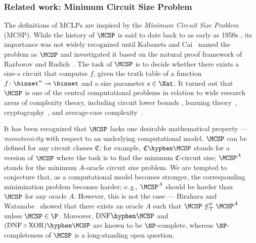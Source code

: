 \documentclass[11pt]{article}
\numberwithin{equation}{section}
\theoremstyle{definition}
\theoremstyle{plain}
\newcommand{\eg}{e.\,g.}
\begin{document}
\subsubsection{Related work: Minimum Circuit Size Problem}
The definitions of MCLPs  are inspired by
the \emph{Minimum Circuit Size Problem} (MCSP).
%
%
While the history of $\MCSP$ is said to date back to as early as 1950s \cite{Trakhtenbrot84_annals_journals},
its importance was not widely recognized
until
Kabanets and Cai~\cite{KabanetsC00_stoc_conf}
named the problem as $\MCSP$
and investigated it
based on the natural proof framework of Razborov and Rudich~\cite{RazborovR97_jcss_journals}.
The task of $\MCSP$
is
to decide whether there exists a size-$s$ circuit that computes $f$,
given the truth table of a function $f \colon \binset^n \to \binset$
and a size parameter $s \in \Nat$.
It turned out
that
$\MCSP$
is one of the central computational problems
in relation to wide research areas of complexity theory,
including
circuit lower bounds \cite{RazborovR97_jcss_journals,OliveiraS18_focs_conf},
learning theory~\cite{CarmosinoIKK16_coco_conf},
cryptography~\cite{RazborovR97_jcss_journals, AllenderBKMR06_siamcomp_journals, AllenderH19_toct_journals, Santhanam20_innovations_conf},
and
average-case complexity~\cite{Hirahara18_focs_conf}.


It has been recognized that $\MCSP$ lacks one desirable mathematical property --- \emph{monotonicity} with respect to an underlying computational model.
$\MCSP$ can be defined for any circuit classes $\mathfrak{C}$;
for example,
$\mathfrak{C}\hyphen\MCSP$ stands for a version of $\MCSP$ where the task is to find the minimum $\mathfrak{C}$-circuit size;
$\MCSP^A$ stands for the minimum $A$-oracle circuit size problem.
We are tempted to conjecture that,
as a computational model becomes stronger,
the corresponding minimization problem becomes harder;
\eg,
$\MCSP^A$ should be harder than $\MCSP$ for any oracle $A$.
However, this is not the case ---
Hirahara and Watanabe~\cite{HiraharaW16_coco_conf}
showed that there exists an oracle $A$ such that $\MCSP \not\le^p_T \MCSP^A$
unless $\MCSP \in \P$.
Moreover, $\mathrm{DNF}\hyphen\MCSP$ \cite{Masek79,AllenderHMPS08_siamcomp_journals} and $(\mathrm{DNF}\circ\mathrm{XOR})\hyphen\MCSP$ \cite{HiraharaOS18_coco_conf}
are known to be $\NP$-complete, whereas $\NP$-completeness of $\MCSP$ is a long-standing open question.
%
\end{document}
